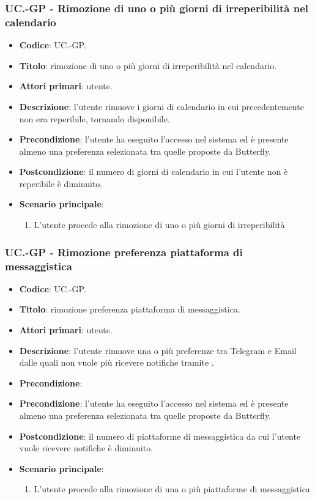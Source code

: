 	\subsubsection{UC\theuccount.\thesubuccount-GP - Rimozione di uno o più giorni di irreperibilità nel calendario}
	\begin{itemize}
		\item \textbf{Codice}: UC\theuccount.\thesubuccount-GP.
		\item \textbf{Titolo}: rimozione di uno o più giorni di irreperibilità nel calendario.
		\item \textbf{Attori primari}: utente.
		\item \textbf{Descrizione}: l’utente rimuove i giorni di calendario in cui precedentemente	non era reperibile, tornando disponibile.
		\item \textbf{Precondizione}: l’utente ha eseguito l'accesso nel sistema ed è presente almeno
        una preferenza selezionata tra quelle proposte da Butterfly.
		\item \textbf{Postcondizione}: il numero di giorni di calendario in cui l’utente non è reperibile è diminuito.
		\item \textbf{Scenario principale}:
		\begin{enumerate}
			\item L'utente procede alla rimozione di uno o più giorni di irreperibilità
		\end{enumerate}
	\end{itemize}

	\subsubsection{UC\theuccount.\thesubuccount-GP - Rimozione preferenza piattaforma di messaggistica}
	\begin{itemize}
		\item \textbf{Codice}: UC\theuccount.\thesubuccount-GP.
		\item \textbf{Titolo}: rimozione preferenza piattaforma di messaggistica.
		\item \textbf{Attori primari}: utente.
		\item \textbf{Descrizione}: l’utente rimuove una o più preferenze tra Telegram e Email dalle	quali non vuole più ricevere notifiche tramite \progetto.
		\item \textbf{Precondizione}: \item \textbf{Precondizione}: l’utente ha eseguito l'accesso nel sistema ed è presente almeno
        una preferenza selezionata tra quelle proposte da Butterfly.
		\item \textbf{Postcondizione}: il numero di piattaforme di messaggistica da cui l’utente vuole ricevere notifiche è diminuito.
		\item \textbf{Scenario principale}:
		\begin{enumerate}
			\item L'utente procede alla rimozione di una o più piattaforme di messaggistica
		\end{enumerate}
	\end{itemize}

